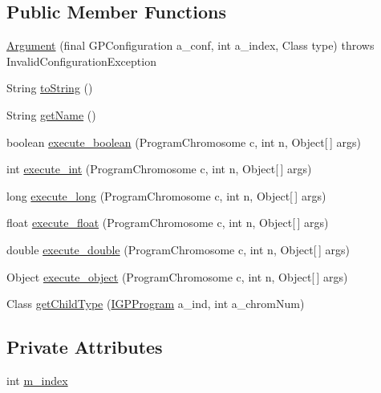 \subsection*{Public Member Functions}
\begin{DoxyCompactItemize}
\item 
\hyperlink{classorg_1_1jgap_1_1gp_1_1terminal_1_1_argument_a730af6655e2539dbbdf5ad8161bd6518}{Argument} (final G\-P\-Configuration a\-\_\-conf, int a\-\_\-index, Class type)  throws Invalid\-Configuration\-Exception 
\item 
String \hyperlink{classorg_1_1jgap_1_1gp_1_1terminal_1_1_argument_a16d7f8f3b7914bc0dff034899b1b8bb3}{to\-String} ()
\item 
String \hyperlink{classorg_1_1jgap_1_1gp_1_1terminal_1_1_argument_a8090805d65db8ca8287109a73df8e13c}{get\-Name} ()
\item 
boolean \hyperlink{classorg_1_1jgap_1_1gp_1_1terminal_1_1_argument_afefa1cc1f047ec93533c0ce9ab182bf7}{execute\-\_\-boolean} (Program\-Chromosome c, int n, Object\mbox{[}$\,$\mbox{]} args)
\item 
int \hyperlink{classorg_1_1jgap_1_1gp_1_1terminal_1_1_argument_a176c023b368129edc529254645e99287}{execute\-\_\-int} (Program\-Chromosome c, int n, Object\mbox{[}$\,$\mbox{]} args)
\item 
long \hyperlink{classorg_1_1jgap_1_1gp_1_1terminal_1_1_argument_a886ebd7e4b20642ad22c8bb810cbdc10}{execute\-\_\-long} (Program\-Chromosome c, int n, Object\mbox{[}$\,$\mbox{]} args)
\item 
float \hyperlink{classorg_1_1jgap_1_1gp_1_1terminal_1_1_argument_a06d11e994b44ecf6de604f74e5e38605}{execute\-\_\-float} (Program\-Chromosome c, int n, Object\mbox{[}$\,$\mbox{]} args)
\item 
double \hyperlink{classorg_1_1jgap_1_1gp_1_1terminal_1_1_argument_a8e008cf3642ff7d23dbbec34c22aa9c3}{execute\-\_\-double} (Program\-Chromosome c, int n, Object\mbox{[}$\,$\mbox{]} args)
\item 
Object \hyperlink{classorg_1_1jgap_1_1gp_1_1terminal_1_1_argument_a7980fdbdbd56f53e6fa8745dd97714b9}{execute\-\_\-object} (Program\-Chromosome c, int n, Object\mbox{[}$\,$\mbox{]} args)
\item 
Class \hyperlink{classorg_1_1jgap_1_1gp_1_1terminal_1_1_argument_ab729abaeaa6f1108970876f257c1b504}{get\-Child\-Type} (\hyperlink{interfaceorg_1_1jgap_1_1gp_1_1_i_g_p_program}{I\-G\-P\-Program} a\-\_\-ind, int a\-\_\-chrom\-Num)
\end{DoxyCompactItemize}
\subsection*{Private Attributes}
\begin{DoxyCompactItemize}
\item 
int \hyperlink{classorg_1_1jgap_1_1gp_1_1terminal_1_1_argument_abb43ae28c3638e8f5ad85a75f628774a}{m\-\_\-index}
\end{DoxyCompactItemize}
